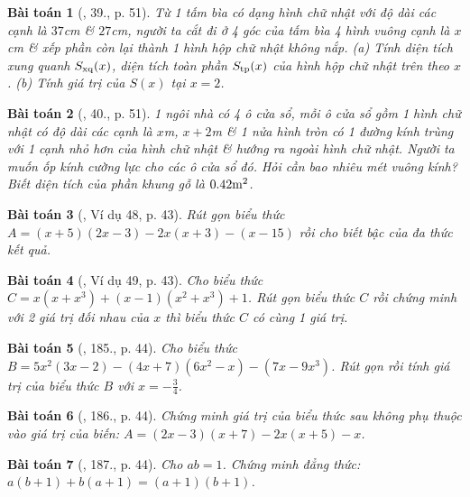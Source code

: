 \documentclass{article}
\newtheorem{baitoan}{Bài toán}
\begin{document}
\begin{baitoan}[\cite{SBT_Toan_7_Canh_Dieu_tap_2}, 39., p. 51]
	Từ 1 tấm bìa có dạng hình chữ nhật với độ dài các cạnh là $37$\emph{cm} \& $27$\emph{cm}, người ta cắt đi ở 4 góc của tấm bìa 4 hình vuông cạnh là $x$\emph{cm} \& xếp phần còn lại thành 1 hình hộp chữ nhật không nắp. (a) Tính diện tích xung quanh $S_{\rm xq}(x)$, diện tích toàn phần $S_{\rm tp}(x)$ của hình hộp chữ nhật trên theo $x$. (b) Tính giá trị của $S(x)$ tại $x = 2$.
\end{baitoan}

\begin{baitoan}[\cite{SBT_Toan_7_Canh_Dieu_tap_2}, 40., p. 51]
	1 ngôi nhà có 4 ô cửa sổ, mỗi ô cửa sổ gồm 1 hình chữ nhật có độ dài các cạnh là $x$\emph{m}, $x + 2$\emph{m} \& 1 nửa hình tròn có 1 đường kính trùng với 1 cạnh nhỏ hơn của hình chữ nhật \& hướng ra ngoài hình chữ nhật. Người ta muốn ốp kính cường lực cho các ô cửa sổ đó. Hỏi cần bao nhiêu mét vuông kính? Biết diện tích của phần khung gỗ là $0.42{\rm m}^2$.
\end{baitoan}

\begin{baitoan}[\cite{Tuyen_Toan_7}, Ví dụ 48, p. 43]
	Rút gọn biểu thức $A =  (x + 5)(2x - 3) - 2x(x + 3) - (x - 15)$ rồi cho biết bậc của đa thức kết quả.
\end{baitoan}

\begin{baitoan}[\cite{Tuyen_Toan_7}, Ví dụ 49, p. 43]
	Cho biểu thức $C = x(x + x^3) + (x - 1)(x^2 + x^3) + 1$. Rút gọn biểu thức $C$ rồi chứng minh với 2 giá trị đối nhau của $x$ thì biểu thức $C$ có cùng 1 giá trị.
\end{baitoan}

\begin{baitoan}[\cite{Tuyen_Toan_7}, 185., p. 44]
	Cho biểu thức $B = 5x^2(3x - 2) - (4x + 7)(6x^2 - x) - (7x - 9x^3)$. Rút gọn rồi  tính giá trị của biểu thức $B$ với $x = -\frac{3}{4}$.
\end{baitoan}

\begin{baitoan}[\cite{Tuyen_Toan_7}, 186., p. 44]
	Chứng minh giá trị của biểu thức sau không phụ thuộc vào giá trị của biến: $A = (2x - 3)(x + 7) - 2x(x + 5) - x$. 
\end{baitoan}

\begin{baitoan}[\cite{Tuyen_Toan_7}, 187., p. 44]
	Cho $ab = 1$. Chứng minh đẳng thức: $a(b + 1) + b(a + 1) = (a + 1)(b + 1)$.
\end{baitoan}
\end{document}
